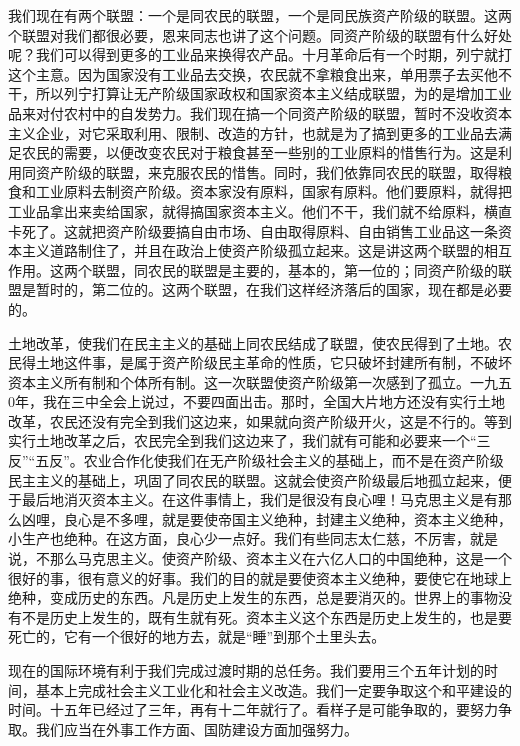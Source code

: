 我们现在有两个联盟：一个是同农民的联盟，一个是同民族资产阶级的联盟。这两个联盟对我们都很必要，恩来同志也讲了这个问题。同资产阶级的联盟有什么好处呢？我们可以得到更多的工业品来换得农产品。十月革命后有一个时期，列宁就打这个主意。因为国家没有工业品去交换，农民就不拿粮食出来，单用票子去买他不干，所以列宁打算让无产阶级国家政权和国家资本主义结成联盟，为的是增加工业品来对付农村中的自发势力。我们现在搞一个同资产阶级的联盟，暂时不没收资本主义企业，对它采取利用、限制、改造的方针，也就是为了搞到更多的工业品去满足农民的需要，以便改变农民对于粮食甚至一些别的工业原料的惜售行为。这是利用同资产阶级的联盟，来克服农民的惜售。同时，我们依靠同农民的联盟，取得粮食和工业原料去制资产阶级。资本家没有原料，国家有原料。他们要原料，就得把工业品拿出来卖给国家，就得搞国家资本主义。他们不干，我们就不给原料，横直卡死了。这就把资产阶级要搞自由市场、自由取得原料、自由销售工业品这一条资本主义道路制住了，并且在政治上使资产阶级孤立起来。这是讲这两个联盟的相互作用。这两个联盟，同农民的联盟是主要的，基本的，第一位的；同资产阶级的联盟是暂时的，第二位的。这两个联盟，在我们这样经济落后的国家，现在都是必要的。

土地改革，使我们在民主主义的基础上同农民结成了联盟，使农民得到了土地。农民得土地这件事，是属于资产阶级民主革命的性质，它只破坏封建所有制，不破坏资本主义所有制和个体所有制。这一次联盟使资产阶级第一次感到了孤立。一九五0年，我在三中全会上说过，不要四面出击。那时，全国大片地方还没有实行土地改革，农民还没有完全到我们这边来，如果就向资产阶级开火，这是不行的。等到实行土地改革之后，农民完全到我们这边来了，我们就有可能和必要来一个“三反”“五反”。农业合作化使我们在无产阶级社会主义的基础上，而不是在资产阶级民主主义的基础上，巩固了同农民的联盟。这就会使资产阶级最后地孤立起来，便于最后地消灭资本主义。在这件事情上，我们是很没有良心哩！马克思主义是有那么凶哩，良心是不多哩，就是要使帝国主义绝种，封建主义绝种，资本主义绝种，小生产也绝种。在这方面，良心少一点好。我们有些同志太仁慈，不厉害，就是说，不那么马克思主义。使资产阶级、资本主义在六亿人口的中国绝种，这是一个很好的事，很有意义的好事。我们的目的就是要使资本主义绝种，要使它在地球上绝种，变成历史的东西。凡是历史上发生的东西，总是要消灭的。世界上的事物没有不是历史上发生的，既有生就有死。资本主义这个东西是历史上发生的，也是要死亡的，它有一个很好的地方去，就是“睡”到那个土里头去。

现在的国际环境有利于我们完成过渡时期的总任务。我们要用三个五年计划的时间，基本上完成社会主义工业化和社会主义改造。我们一定要争取这个和平建设的时间。十五年已经过了三年，再有十二年就行了。看样子是可能争取的，要努力争取。我们应当在外事工作方面、国防建设方面加强努力。

